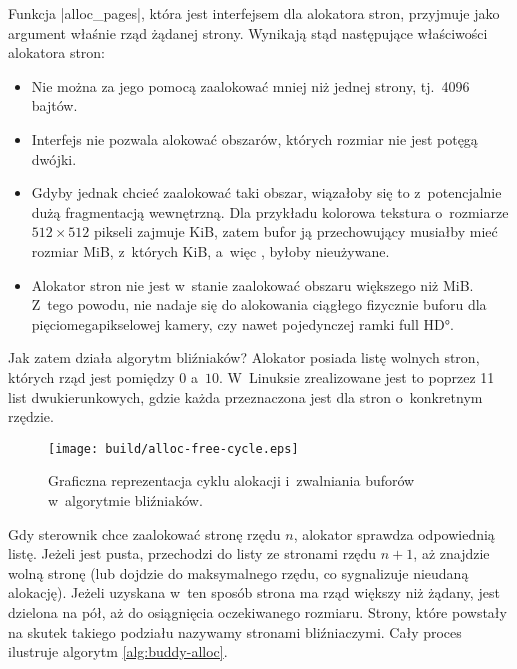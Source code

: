 Funkcja \code|alloc_pages|, która jest interfejsem dla alokatora
stron, przyjmuje jako argument właśnie rząd żądanej strony.  Wynikają
stąd następujące właściwości alokatora stron:

\begin{itemize}
\item Nie można za jego pomocą zaalokować mniej niż jednej strony,
  tj.\ 4096 bajtów.
\item Interfejs nie pozwala alokować obszarów, których rozmiar nie
  jest potęgą dwójki.
\item Gdyby jednak chcieć zaalokować taki obszar, wiązałoby się to
  z~potencjalnie dużą fragmentacją wewnętrzną.  Dla przykładu kolorowa
  tekstura o~rozmiarze $512 \times 512$ pikseli zajmuje
  \unit[768]{KiB}, zatem bufor ją przechowujący musiałby mieć rozmiar
  \unit[1]{MiB}, z~których \unit[256]{KiB}, a~więc ,
  byłoby nieużywane.
\item Alokator stron nie jest w~stanie zaalokować obszaru większego
  niż \unit[4]{MiB}.  Z~tego powodu, nie nadaje się do alokowania
  ciągłego fizycznie buforu dla pięciomegapikselowej kamery, czy nawet
  pojedynczej ramki \ang*{full HD}.
\end{itemize}

Jak zatem działa algorytm bliźniaków?  Alokator posiada listę wolnych
stron, których rząd jest pomiędzy $0$ a~$10$.  W~Linuksie zrealizowane
jest to poprzez 11 list dwukierunkowych, gdzie każda przeznaczona jest
dla stron o~konkretnym rzędzie.

\begin{wrapfigure}{o}[1cm]{0.3\textwidth}
\begin{center}
\texttt{[image: build/alloc-free-cycle.eps]}
\end{center}
\caption[Zarządzanie pamięcią w~algorytmie bliźniaków]{Graficzna
  reprezentacja cyklu alokacji i~zwalniania buforów w~algorytmie
  bliźniaków.}
\end{wrapfigure}

Gdy sterownik chce zaalokować stronę rzędu $n$, alokator sprawdza
odpowiednią listę.  Jeżeli jest pusta, przechodzi do listy ze stronami
rzędu $n+1$, aż znajdzie wolną stronę (lub dojdzie do maksymalnego
rzędu, co sygnalizuje nieudaną alokację).  Jeżeli uzyskana w~ten
sposób strona ma rząd większy niż żądany, jest dzielona na pół, aż do
osiągnięcia oczekiwanego rozmiaru.  Strony, które powstały na skutek
takiego podziału nazywamy stronami bliźniaczymi.  Cały proces
ilustruje algorytm \ref{alg:buddy-alloc}.

